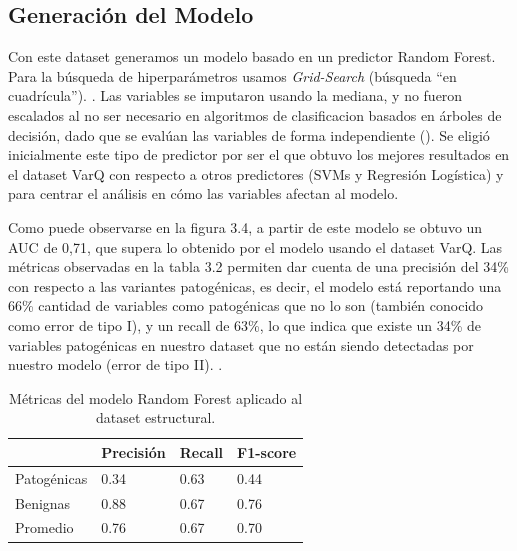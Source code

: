
\subsection{Generación del Modelo}

Con este dataset generamos un modelo basado en un predictor Random Forest. Para la búsqueda de hiperparámetros usamos \textit{Grid-Search} (búsqueda ``en cuadrícula''). . Las variables se imputaron usando la mediana, y no fueron escalados al no ser necesario en algoritmos de clasificacion basados en árboles de decisión, dado que se evalúan las variables de forma independiente (). Se eligió inicialmente este tipo de predictor por ser el que obtuvo los mejores resultados en el dataset VarQ  con respecto a otros predictores (SVMs y Regresión Logística) y para centrar el análisis en cómo las variables afectan al modelo.  

Como puede observarse en la figura 3.4, a partir de este modelo se obtuvo un AUC de 0,71, que supera lo obtenido por el modelo usando el dataset VarQ. Las métricas observadas en la tabla 3.2 permiten dar cuenta de una precisión del 34\% con respecto a las variantes patogénicas, es decir, el modelo está reportando una 66\% cantidad de variables como patogénicas que no lo son (también conocido como error de tipo I), y un recall de 63\%, lo que indica que existe un 34\% de variables patogénicas en nuestro dataset que no están siendo detectadas por nuestro modelo (error de tipo II). .

\begin{table}[H]
\centering
\begin{tabular}{|l|l|l|l|}
\hline
              & Precisión & Recall & F1-score \\ \hline
Patogénicas   & 0.34      & 0.63   & 0.44     \\ \hline
Benignas      & 0.88      & 0.67   & 0.76     \\ \hline
Promedio      & 0.76      & 0.67   & 0.70     \\ \hline
\end{tabular}
\caption{Métricas del modelo Random Forest aplicado al dataset estructural.}
\label{my-label}
\end{table}


